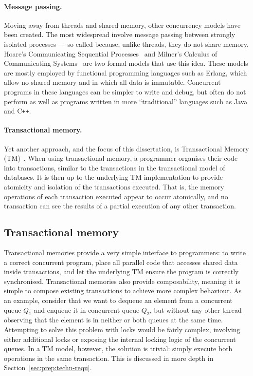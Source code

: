 \documentclass[12pt,a4paper,oneside,openright]{report}
\begin{document}
\paragraph{Message passing.} Moving away from threads and shared
memory, other concurrency models have been created. The most
widespread involve message passing between strongly isolated processes
--- so called because, unlike threads, they do not share
memory. Hoare's Communicating Sequential Processes~\cite{CSP} and
Milner's Calculus of Communicating Systems~\cite{CCS} are two formal
models that use this idea. These models are mostly employed by
functional programming languages such as Erlang, which allow no shared
memory and in which all data is immutable. Concurrent programs in
these languages can be simpler to write and debug, but often do not
perform as well as programs written in more ``traditional'' languages
such as Java and C\texttt{++}.

\paragraph{Transactional memory.} Yet another approach, and the focus
of this dissertation, is Transactional Memory (TM)~\cite{TMBook}. When
using transactional memory, a programmer organises their code into
transactions, similar to the transactions in the transactional model
of databases. It is then up to the underlying TM implementation to
provide atomicity and isolation of the transactions executed. That is,
the memory operations of each transaction executed appear to occur
atomically, and no transaction can see the results of a partial
execution of any other transaction.

\subsection{Transactional memory}
\label{sec:transactional-memory}

Transactional memories provide a very simple interface to programmers:
to write a correct concurrent program, place all parallel code that
accesses shared data inside transactions, and let the underlying TM
ensure the program is correctly synchronised. Transactional memories
also provide composability, meaning it is simple to compose existing
transactions to achieve more complex behaviour. As an example,
consider that we want to dequeue an element from a concurrent queue
$Q_1$ and enqueue it in concurrent queue $Q_2$, but without any other
thread observing that the element is in neither or both queues at the
same time. Attempting to solve this problem with locks would be fairly
complex, involving either additional locks or exposing the internal
locking logic of the concurrent queues. In a TM model, however, the
solution is trivial: simply execute both operations in the same
transaction. This is discussed in more depth in
Section~\ref{sec:prep:techn-requ}.
\end{document}
